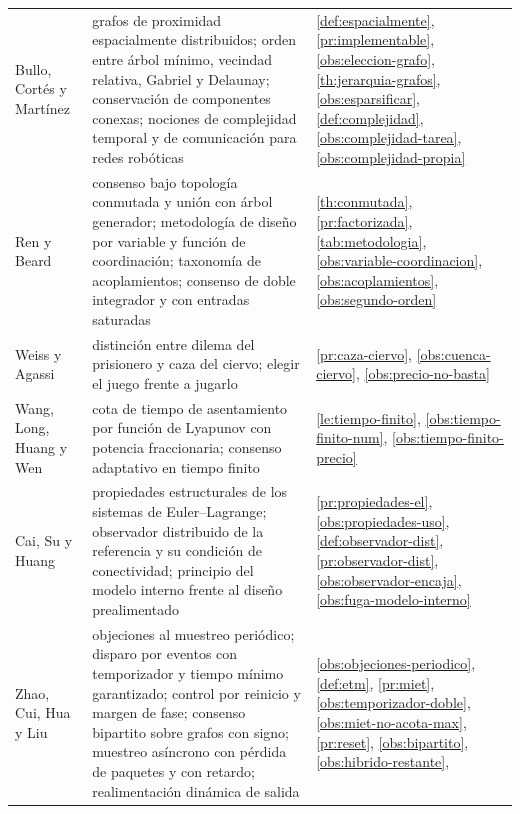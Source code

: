 \begin{table}[!ht]
\begin{tabularx}{\textwidth}{@{}p{4.6cm}p{3.5cm}X@{}}
Bullo, Cortés y Martínez \cite{bullo2009distributed}
  & grafos de proximidad espacialmente distribuidos; orden entre árbol mínimo,
    vecindad relativa, Gabriel y Delaunay; conservación de componentes conexas;
    nociones de complejidad temporal y de comunicación para redes robóticas
  & \cref{def:espacialmente}, \cref{pr:implementable},
    \cref{obs:eleccion-grafo}, \cref{th:jerarquia-grafos},
    \cref{obs:esparsificar}, \cref{def:complejidad},
    \cref{obs:complejidad-tarea}, \cref{obs:complejidad-propia} \\
Ren y Beard \cite{ren2008distributed}
  & consenso bajo topología conmutada y unión con árbol generador; metodología
    de diseño por variable y función de coordinación; taxonomía de
    acoplamientos; consenso de doble integrador y con entradas saturadas
  & \cref{th:conmutada}, \cref{pr:factorizada}, \cref{tab:metodologia},
    \cref{obs:variable-coordinacion}, \cref{obs:acoplamientos},
    \cref{obs:segundo-orden} \\
Weiss y Agassi \cite{weiss2023games}
  & distinción entre dilema del prisionero y caza del ciervo; elegir el juego
    frente a jugarlo
  & \cref{pr:caza-ciervo}, \cref{obs:cuenca-ciervo},
    \cref{obs:precio-no-basta} \\
Wang, Long, Huang y Wen \cite{wang2024adaptive}
  & cota de tiempo de asentamiento por función de Lyapunov con potencia
    fraccionaria; consenso adaptativo en tiempo finito
  & \cref{le:tiempo-finito}, \cref{obs:tiempo-finito-num},
    \cref{obs:tiempo-finito-precio} \\
Cai, Su y Huang \cite{cai2022cooperative}
  & propiedades estructurales de los sistemas de Euler--Lagrange; observador
    distribuido de la referencia y su condición de conectividad; principio del
    modelo interno frente al diseño prealimentado
  & \cref{pr:propiedades-el}, \cref{obs:propiedades-uso},
    \cref{def:observador-dist}, \cref{pr:observador-dist},
    \cref{obs:observador-encaja}, \cref{obs:fuga-modelo-interno} \\
Zhao, Cui, Hua y Liu \cite{zhao2024hybrid}
  & objeciones al muestreo periódico; disparo por eventos con temporizador y
    tiempo mínimo garantizado; control por reinicio y margen de fase; consenso
    bipartito sobre grafos con signo; muestreo asíncrono con pérdida de
    paquetes y con retardo; realimentación dinámica de salida
  & \cref{obs:objeciones-periodico}, \cref{def:etm}, \cref{pr:miet},
    \cref{obs:temporizador-doble}, \cref{obs:miet-no-acota-max},
    \cref{pr:reset}, \cref{obs:bipartito}, \cref{obs:hibrido-restante},

\end{tabularx}
\end{table}

